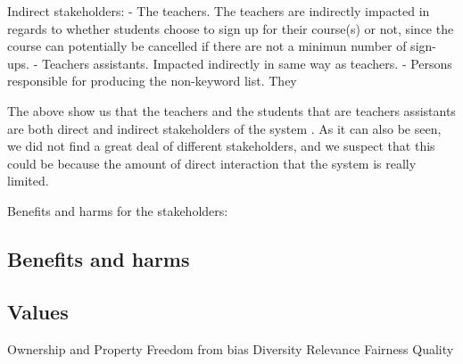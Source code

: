 Indirect stakeholders: 
- The teachers. The teachers are indirectly impacted in regards to whether students choose to sign up for their course(s) or not, since the course can potentially be cancelled if there are not a minimun number of sign-ups.
- Teachers assistants. Impacted indirectly in same way as teachers.
- Persons responsible for producing the non-keyword list. They 


The above show us that the teachers and the students that are teachers assistants are both direct and indirect stakeholders of the system . As it can also be seen, we did not find a great deal of different stakeholders, and we suspect that this could be because the amount of direct interaction that the system is really limited. 


Benefits and harms for the stakeholders:




\subsection{Benefits and harms}



\subsection{Values}

Ownership and Property
Freedom from bias
Diversity
Relevance
Fairness
Quality


